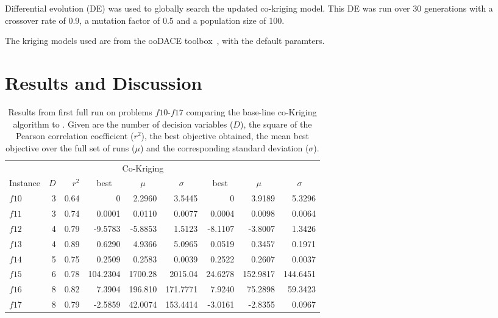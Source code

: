 \documentclass[journal]{IEEEtran}
\begin{document}
Differential evolution (DE) was used to globally search the updated co-kriging model. This DE was run over 30 generations with a crossover rate of 0.9, a mutation factor of 0.5 and a population size of 100.

The kriging models used are from the ooDACE toolbox~\cite{oodace}, with the default paramters.

\section{Results and Discussion}\label{sec:results}
\begin{table}[h!]
\centering
\caption{Results from first full run  on problems $f10$-$f17$ comparing the base-line co-Kriging algorithm to \AlgName{}. Given are the number of decision variables ($D$), the square of the Pearson correlation coefficient ($r^2$), the best objective obtained, the mean best objective over the full set of runs ($\mu$) and the corresponding standard deviation ($\sigma$).}\label{tab:results}
\begin{tabular}{lrrrrrrrr} \toprule
& & & \multicolumn{3}{c}{Co-Kriging} & \multicolumn{3}{c}{\AlgName{}}\\
\cmidrule(lr){4-6} \cmidrule(lr){7-9}
Instance & $D$ & $r^2$ &\multicolumn{1}{c}{best}&\multicolumn{1}{c}{\(\mu\)} & \multicolumn{1}{c}{\(\sigma\)}&\multicolumn{1}{c}{best}& \multicolumn{1}{c}{\(\mu\)}&\multicolumn{1}{c}{\(\sigma\)}\\ \midrule
%
$f10$ & 3 & 0.64 &        0 &  2.2960  &  3.5445  &       0 &   3.9189 &  5.3296\\
$f11$ & 3 & 0.74 &   0.0001 &  0.0110  &  0.0077  &  0.0004 &   0.0098 &  0.0064\\
$f12$ & 4 & 0.79 &  -9.5783 & -5.8853  &  1.5123  & -8.1107 &  -3.8007 &  1.3426\\
$f13$ & 4 & 0.89 &   0.6290 &  4.9366  &  5.0965  &  0.0519 &   0.3457 &  0.1971\\
$f14$ & 5 & 0.75 &   0.2509 &  0.2583  &  0.0039  &  0.2522 &   0.2607 &  0.0037\\
$f15$ & 6 & 0.78 & 104.2304 &  1700.28 &  2015.04 & 24.6278 & 152.9817 &144.6451\\
$f16$ & 8 & 0.82 & 7.3904   &  196.810 &  171.7771&  7.9240 &  75.2898 & 59.3423\\
$f17$ & 8 & 0.79 & -2.5859  &  42.0074 &  153.4414& -3.0161 & -2.8355 & 0.0967\\
%
\bottomrule
\end{tabular}
\end{table}
\end{document}
